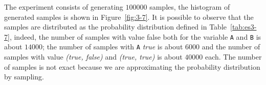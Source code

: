 The experiment consists of generating $100000$ samples, the histogram of generated samples is shown in Figure~\ref{fig:3-7}.
It is possible to observe that the samples are distributed as the probability distribution defined in Table~\ref{tab:es3-7},
indeed, the number of samples with value false both for the variable \texttt{A} and \texttt{B} is about $14000$; the number of
samples with \texttt{A} \textit{true} is about $6000$ and the number of samples with value \textit{(true, false)} and 
\textit{(true, true)} is about $40000$ each. 
The number of samples is not exact because we are approximating the probability distribution by sampling.